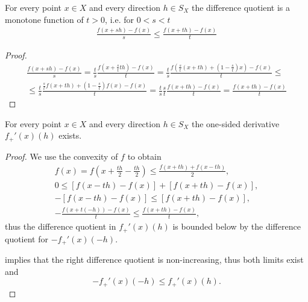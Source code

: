 \begin{lemma}
  \label{thm:convex_difference_quotient_grows}
  For every point \( x \in X \) and every direction \( h \in S_X \) the difference quotient is a monotone function of \( t > 0 \), i.e. for \( 0 < s < t \)
  \begin{align*}
    \frac {f(x + sh) - f(x)} s
    \leq
    \frac {f(x + th) - f(x)} t
  \end{align*}
\end{lemma}
\begin{proof}
  \begin{align*}
    \frac {f(x + sh) - f(x)} s
    =
    \frac t s \frac {f(x + \frac s t t h) - f(x)} t
    =
    \frac t s \frac {f\left(\frac s t (x + th) + (1 - \frac s t) x \right) - f(x)} t
    \leq \\ \leq
    \frac t s \frac {\frac s t f(x + t h) + (1 - \frac s t) f(x) - f(x)} t
    =
    \frac t s \frac s t \frac {f(x + th) - f(x)} t
    =
    \frac {f(x + th) - f(x)} t
  \end{align*}
\end{proof}

\begin{proposition}\label{thm:convex_one_sided_derivatives_exist}
  For every point \( x \in X \) and every direction \( h \in S_X \) the one-sided derivative \( f_+'(x)(h) \) exists.
\end{proposition}
\begin{proof}
  We use the convexity of \( f \) to obtain
  \begin{align*}
    f(x) = f \left(x + \frac {th} 2 - \frac {th} 2 \right) \leq \frac {f(x + th) + f(x - th)} 2,
    \\
    0 \leq [f(x - th) - f(x)] + [f(x + th) - f(x)],
    \\
    -[f(x - th) - f(x)] \leq [f(x + th) - f(x)],
    \\
    -\frac {f(x + t(-h)) - f(x)} t \leq \frac {f(x + th) - f(x)} t,
  \end{align*}
  thus the difference quotient in \( f_+'(x)(h) \) is bounded below by the difference quotient for \( -f_+'(x)(-h) \).

   implies that the right difference quotient is non-increasing, thus both limits exist and
  \begin{equation*}
    -f_+'(x)(-h) \leq f_+'(x)(h).
  \end{equation*}
\end{proof}

